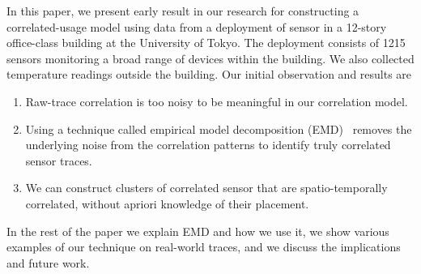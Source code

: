 In this paper, we present early result in our research for constructing a correlated-usage model using data
from a deployment of sensor in a 12-story office-class building at the University of Tokyo.  The deployment
consists of 1215 sensors monitoring a broad range of devices within the building.  We also collected temperature
readings outside the building.  Our initial observation and results are

\begin{enumerate}
\item Raw-trace correlation is too noisy to be meaningful in our correlation model.
\item Using a technique called empirical model decomposition (EMD)~\cite{huang:emd1998} removes the 
		underlying noise from the correlation patterns to identify truly correlated sensor traces.
\item We can construct clusters of correlated sensor that are spatio-temporally correlated, without
		apriori knowledge of their placement.
\end{enumerate}

In the rest of the paper we explain EMD and how we use it, we show various examples of our technique on real-world
traces, and we discuss the implications and future work.







